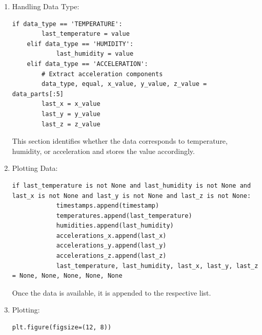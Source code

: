 \begin{enumerate}
    \item Handling Data Type:
    \begin{lstlisting}[caption={Handling Data Type}]
    if data_type == 'TEMPERATURE':
        last_temperature = value
    elif data_type == 'HUMIDITY':
            last_humidity = value
    elif data_type == 'ACCELERATION':
        # Extract acceleration components
        data_type, equal, x_value, y_value, z_value = data_parts[:5]
        last_x = x_value
        last_y = y_value
        last_z = z_value
    \end{lstlisting}
    This section identifies whether the data corresponds to temperature, humidity, or acceleration and stores the value accordingly.
    \item Plotting Data:
    \begin{lstlisting}[caption={Plotting Data}]
    if last_temperature is not None and last_humidity is not None and last_x is not None and last_y is not None and last_z is not None:
            timestamps.append(timestamp)
            temperatures.append(last_temperature)
            humidities.append(last_humidity)
            accelerations_x.append(last_x)
            accelerations_y.append(last_y)
            accelerations_z.append(last_z)
            last_temperature, last_humidity, last_x, last_y, last_z = None, None, None, None, None
    \end{lstlisting}
    Once the data is available, it is appended to the respective list.
    \item Plotting:
    \begin{lstlisting}[caption={Plotting}]
    plt.figure(figsize=(12, 8))


\end{lstlisting}
\end{enumerate}

